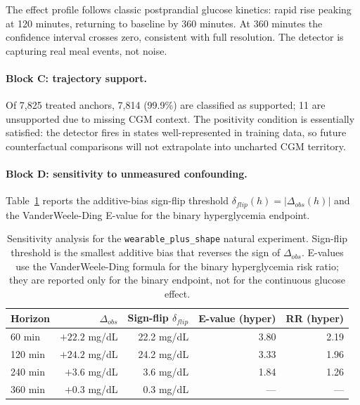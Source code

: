 The effect profile follows classic postprandial glucose kinetics: rapid rise peaking at 120 minutes, returning to baseline by 360 minutes. At 360 minutes the confidence interval crosses zero, consistent with full resolution. The detector is capturing real meal events, not noise.

\paragraph{Block C: trajectory support.}
Of 7,825 treated anchors, 7,814 (99.9\%) are classified as supported; 11 are unsupported due to missing CGM context. The positivity condition is essentially satisfied: the detector fires in states well-represented in training data, so future counterfactual comparisons will not extrapolate into uncharted CGM territory.

\paragraph{Block D: sensitivity to unmeasured confounding.}
Table~\ref{tab:cf-sensitivity} reports the additive-bias sign-flip threshold $\delta_{flip}(h) = |\Delta_{obs}(h)|$ and the VanderWeele-Ding E-value for the binary hyperglycemia endpoint.

\begin{table}[t]
    \centering
    \caption{Sensitivity analysis for the \texttt{wearable\_plus\_shape} natural experiment. Sign-flip threshold is the smallest additive bias that reverses the sign of $\Delta_{obs}$. E-values use the VanderWeele-Ding formula \citep{vanderweele2017evalue} for the binary hyperglycemia risk ratio; they are reported only for the binary endpoint, not for the continuous glucose effect.}
    \label{tab:cf-sensitivity}
    \begin{tabular}{lrrrr}
        \toprule
        Horizon & $\Delta_{obs}$ & Sign-flip $\delta_{flip}$ & E-value (hyper) & RR (hyper) \\
        \midrule
        60 min  & $+22.2$ mg/dL & 22.2 mg/dL & 3.80 & 2.19 \\
        120 min & $+24.2$ mg/dL & 24.2 mg/dL & 3.33 & 1.96 \\
        240 min & $+3.6$ mg/dL  & 3.6 mg/dL  & 1.84 & 1.26 \\
        360 min & $+0.3$ mg/dL  & 0.3 mg/dL  & --- & --- \\
        \bottomrule
    \end{tabular}
\end{table}

